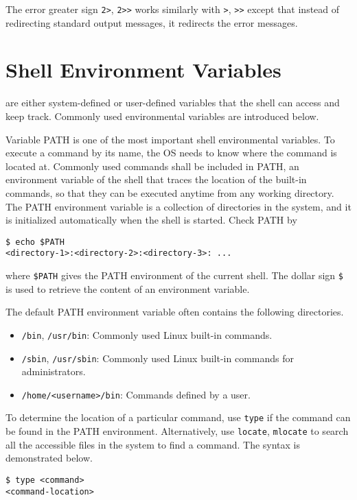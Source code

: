 The error greater sign \verb|2>|, \verb|2>>| works similarly with \verb|>|, \verb|>>| except that instead of redirecting standard output messages, it redirects the error messages.

\section{Shell Environment Variables}\label{ch:sb:subsec:shellenvvar}

 are either system-defined or user-defined variables that the shell can access and keep track. Commonly used environmental variables are introduced below.

Variable PATH is one of the most important shell environmental variables. To execute a command by its name, the OS needs to know where the command is located at. Commonly used commands shall be included in PATH, an environment variable of the shell that traces the location of the built-in commands, so that they can be executed anytime from any working directory. The PATH environment variable is a collection of directories in the system, and it is initialized automatically when the shell is started. Check PATH by
\begin{lstlisting}
$ echo $PATH
<directory-1>:<directory-2>:<directory-3>: ...
\end{lstlisting}
where \verb|$PATH| gives the PATH environment of the current shell. The dollar sign \verb|$| is used to retrieve the content of an environment variable. 

The default PATH environment variable often contains the following directories. 
\begin{itemize}
\item \verb|/bin|, \verb|/usr/bin|: Commonly used Linux built-in commands.
\item \verb|/sbin|, \verb|/usr/sbin|: Commonly used Linux built-in commands for administrators.
\item \verb|/home/<username>/bin|: Commands defined by a user.
\end{itemize}
To determine the location of a particular command, use \verb|type| if the command can be found in the PATH environment. Alternatively, use \verb|locate|, \verb|mlocate| to search all the accessible files in the system to find a command. The syntax is demonstrated below.
\begin{lstlisting}
$ type <command>
<command-location>
\end{lstlisting}

